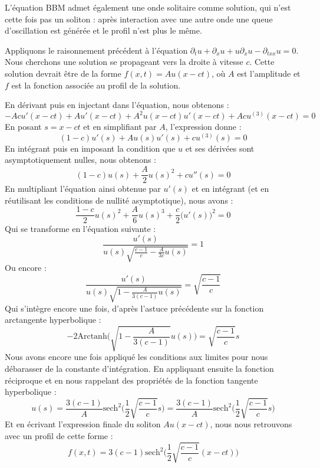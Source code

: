 
L'équation BBM admet également une onde solitaire comme solution, qui n'est cette fois pas un soliton : après interaction avec une autre onde une queue d'oscillation est générée et le profil n'est plus le même. 

Appliquons le raisonnement précédent à l'équation $\partial_t u + \partial_x u + u \partial_x u - \partial_{txx}u = 0$.
Nous cherchons une solution se propageant vers la droite à vitesse $c$. Cette solution devrait être de la forme $f(x,t) = Au(x - ct)$, où $A$ est l'amplitude et $f$ est la fonction associée au profil de la solution.

En dérivant puis en injectant dans l'équation, nous obtenons :
$$ -Acu'(x - ct) + A u'(x-ct) + A^2u(x-ct)u'(x-ct) + Acu^{(3)}(x-ct) = 0 $$
En posant $s = x-ct$ et en simplifiant par $A$, l'expression donne :
$$ (1-c)u'(s) +Au(s)u'(s) + cu^{(3)}(s) =0 $$
En intégrant puis en imposant la condition que $u$ et ses dérivées sont asymptotiquement nulles, nous obtenons :
$$ (1-c)u(s) + \frac{A}{2}u(s)^2 + cu''(s) = 0 $$
En multipliant l'équation ainsi obtenue par $u'(s)$ et en intégrant (et en réutilisant les conditions de nullité asymptotique), nous avons :
$$ \frac{1-c}{2}u(s)^2 + \frac{A}{6}u(s)^3 + \frac{c}{2}\big(u'(s)\big)^2 = 0 $$
Qui se transforme en l'équation suivante :
$$ \frac{u'(s)}{u(s)\sqrt{\frac{c-1}{c} - \frac{A}{3c}u(s) }} =1 $$
Ou encore :
$$\frac{u'(s)}{u(s)\sqrt{1 - \frac{A}{3(c-1)}u(s) }} =\sqrt{\frac{c-1}{c}}$$
Qui s'intègre encore une fois, d'après l'astuce précédente sur la fonction arctangente hyperbolique :
$$ -2\text{Arctanh}\Bigg(\sqrt{1 - \frac{A}{3(c-1)}}u(s)\Bigg) = \sqrt{\frac{c-1}{c}}s$$
Nous avons encore une fois appliqué les conditions aux limites pour nous débarasser de la constante d'intégration.
En appliquant ensuite la fonction réciproque et en nous rappelant des propriétés de la fonction tangente hyperbolique :
$$ u(s) = \frac{3(c-1)}{A} \text{sech}^2\Bigg( \frac{1}{2} \sqrt{\frac{c-1}{c}} s \Bigg) = \frac{3(c-1)}{A} \text{sech}^2\Bigg(\frac{1}{2}\sqrt{\frac{c-1}{c}} s \Bigg) $$
Et en écrivant l'expression finale du soliton $Au(x - ct)$, nous nous retrouvons avec un profil de cette forme :
$$ f(x,t) = 3(c-1) \text{sech}^2\Bigg( \frac{1}{2}\sqrt{\frac{c-1}{c}} (x - ct) \Bigg) $$

